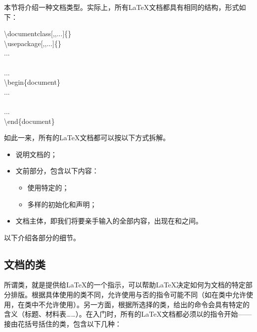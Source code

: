 本节将介绍一种文档类型。实际上，所有\LaTeX 文档都具有相同的结构，形式如下：

\begin{dmd}
\backslash documentclass[,,...]\{\}\\
\backslash usepackage[,,...]\{\}\\
...\\
\\
...\\
\backslash begin\{document\}\\
...\\
\\
...\\
\backslash end\{document\}
\end{dmd}

如此一来，所有的\LaTeX 文档都可以按以下方式拆解。

\begin{itemize}
    \item 说明文档的；
    \item 文前部分，包含以下内容：
        \begin{itemize}
            \item 使用特定的；
            \item 多样的初始化和声明；
        \end{itemize}
    \item 文档主体，即我们将要亲手输入的全部内容，出现在和之间。
\end{itemize}

以下介绍各部分的细节。

\subsection{文档的类}

所谓类，就是提供给\LaTeX 的一个指示，可以帮助\LaTeX 决定如何为文档的特定部分排版。根据具体使用的类不同，允许使用与否的指令可能不同（如在类中允许使用，在类中不允许使用）。另一方面，根据所选择的类，给出的命令会具有特定的含义（标题、材料表……）。在入门时，所有的\LaTeX 文档都必须以的指令开始——接由花括号括住的类，包含以下几种：

